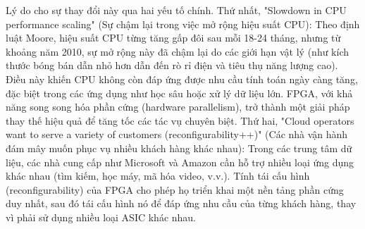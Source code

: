 \documentclass[a4paper]{article}
\begin{document}
\begin{itemize} [label=-]
    Lý do cho sự thay đổi này qua hai yếu tố chính. Thứ nhất, "Slowdown in CPU performance scaling" (Sự chậm lại trong việc mở rộng hiệu suất CPU): Theo định luật Moore, hiệu suất CPU từng tăng gấp đôi sau mỗi 18-24 tháng, nhưng từ khoảng năm 2010, sự mở rộng này đã chậm lại do các giới hạn vật lý (như kích thước bóng bán dẫn nhỏ hơn dẫn đến rò rỉ điện và tiêu thụ năng lượng cao). Điều này khiến CPU không còn đáp ứng được nhu cầu tính toán ngày càng tăng, đặc biệt trong các ứng dụng như học sâu hoặc xử lý dữ liệu lớn. FPGA, với khả năng song song hóa phần cứng (hardware parallelism), trở thành một giải pháp thay thế hiệu quả để tăng tốc các tác vụ chuyên biệt. Thứ hai, "Cloud operators want to serve a variety of customers (reconfigurability++)" (Các nhà vận hành đám mây muốn phục vụ nhiều khách hàng khác nhau): Trong các trung tâm dữ liệu, các nhà cung cấp như Microsoft và Amazon cần hỗ trợ nhiều loại ứng dụng khác nhau (tìm kiếm, học máy, mã hóa video, v.v.). Tính tái cấu hình (reconfigurability) của FPGA cho phép họ triển khai một nền tảng phần cứng duy nhất, sau đó tái cấu hình nó để đáp ứng nhu cầu của từng khách hàng, thay vì phải sử dụng nhiều loại ASIC khác nhau.

\end{itemize}
\end{document}
